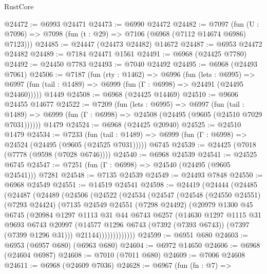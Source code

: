 \begin{lexlean}{RustCore}
\begin{coremodule}
@24472 := @6993 @24471
@24473 := @6990 @24472
@24482 := @7097
    (fun (U : @7096) => @7098 (fun (t : @29) => @7106 (@6968 (@7112 @14674 @6986) @7123)))
@24485 := @24447 (@24473 @24482) @14672
@24487 := @6953 @24472 @24482
@24489 := @7184 @24471 @1561
@24491 := @6968 (@24425 @7780)
@24492 := @24450 @7783
@24493 := @7040 @24492
@24495 := @6968 (@24493 @7061)
@24506 := @7187
    (fun (rty : @1462) =>
    @6996
      (fun (lets : @6995) =>
      @6997 (fun (tail : @1489) => @6999 (fun (Γ : @6998) => @24491 (@24495 @24460)))))
    @1449
@24508 := @6968 (@24425 @14469)
@24510 := @9606 @24455 @14677
@24522 := @7209
    (fun (lets : @6995) =>
    @6997
      (fun (tail : @1489) =>
      @6999 (fun (Γ : @6998) => @24508 (@24495 (@9605 (@24510 @7029 @7031))))))
    @1479
@24524 := @6968 (@24425 @20940)
@24525 := @24510 @1479
@24534 := @7233
    (fun (tail : @1489) => @6999 (fun (Γ : @6998) => @24524 (@24495 (@9605 (@24525 @7031)))))
    @6745
@24539 := @24425 (@7018 (@7778 (@9598 (@7028 @6746))))
@24540 := @6968 @24539
@24541 := @24525 @6745
@24547 := @7251 (fun (Γ : @6998) => @24540 (@24495 (@9605 @24541))) @7281
@24548 := @7135 @24539
@24549 := @24493 @7848
@24550 := @6968 @24549
@24551 := @14519 @24541
@24598 := @24419
    (@24444
      (@24485
        (@24487
          (@24489
            (@24506
              (@24522
                (@24534
                  (@24547
                    (@24548
                      (@24550 @24551)
                      (@7293 @24424)
                      (@7135
                        @24549
                        @24551
                        (@7298 @24492)
                        (@20979
                          @1300
                          @45
                          @6745
                          (@20984
                            @1297
                            @1113
                            @31
                            @44
                            @6743
                            @6257
                            (@14630
                              @1297
                              @1115
                              @31
                              @9693
                              @6743
                              @20997
                              (@14577 @1296 @6743 (@7392 (@7393 @6743)) (@7397 (@7399 @1296 @31)))
                              @21144)))))))))))))
@24599 := @6951 @680
@24603 := @6953 (@6957 @680) (@6963 @680)
@24604 := @6972 @14650
@24606 := @6968 (@24604 @6987)
@24608 := @7010 (@7011 @680)
@24609 := @7006 @24608
@24611 := @6968 (@24609 @7036)
@24628 := @6967
    (fun (fn : @7) =>

\end{coremodule}
\end{lexlean}
